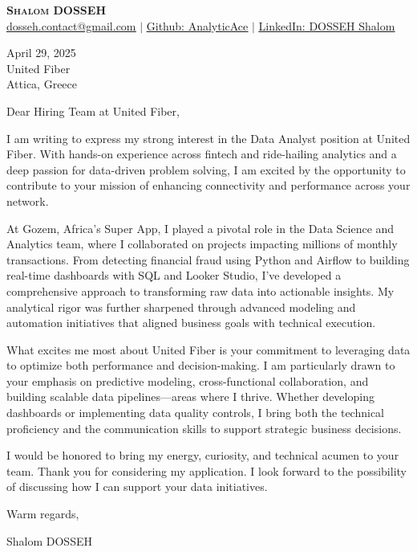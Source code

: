 \documentclass[letterpaper,11pt]{article}
\begin{document}
\begin{center}
    \textbf{\Huge \scshape Shalom DOSSEH} \\ \vspace{1pt}
    \href{mailto:dosseh.contact@gmail.com}{\underline{dosseh.contact@gmail.com}} $|$
    \href{https://github.com/AnalyticAce}{\underline{Github: AnalyticAce}} $|$
    \href{https://www.linkedin.com/in/shalom-dosseh-4a484a262/}{\underline{LinkedIn: DOSSEH Shalom}}
\end{center}

\vspace{1em}

April 29, 2025 \\
United Fiber \\
Attica, Greece

\vspace{1em}

Dear Hiring Team at United Fiber,

\vspace{1em}

I am writing to express my strong interest in the Data Analyst position at United Fiber. With hands-on experience across fintech and ride-hailing analytics and a deep passion for data-driven problem solving, I am excited by the opportunity to contribute to your mission of enhancing connectivity and performance across your network.

At Gozem, Africa's Super App, I played a pivotal role in the Data Science and Analytics team, where I collaborated on projects impacting millions of monthly transactions. From detecting financial fraud using Python and Airflow to building real-time dashboards with SQL and Looker Studio, I’ve developed a comprehensive approach to transforming raw data into actionable insights. My analytical rigor was further sharpened through advanced modeling and automation initiatives that aligned business goals with technical execution.

What excites me most about United Fiber is your commitment to leveraging data to optimize both performance and decision-making. I am particularly drawn to your emphasis on predictive modeling, cross-functional collaboration, and building scalable data pipelines—areas where I thrive. Whether developing dashboards or implementing data quality controls, I bring both the technical proficiency and the communication skills to support strategic business decisions.

I would be honored to bring my energy, curiosity, and technical acumen to your team. Thank you for considering my application. I look forward to the possibility of discussing how I can support your data initiatives.

\vspace{1em}

Warm regards,

\vspace{1em}

Shalom DOSSEH
\end{document}
